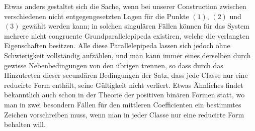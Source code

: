 \documentclass[11pt]{article}
\begin{document}
Etwas anders gestaltet sich die Sache, wenn bei unserer Construction zwischen verschiedenen nicht entgegengesetzten Lagen für die Punkte $(1)$, $(2)$ und $(3)$ gewählt werden kann; in solchen singulären Fällen können für das System mehrere nicht congruente Grundparallelepipeda existiren, welche die verlangten Eigenschaften besitzen. Alle diese Parallelepipeda lassen sich jedoch ohne Schwierigkeit vollständig aufzählen, und man kann immer eines derselben durch gewisse Nebenbedingungen von den übrigen trennen, so dass durch das Hinzutreten dieser secundären Bedingungen der Satz, dass jede Classe nur eine reducirte Form enthält, seine Gültigkeit nicht verliert. Etwas Ähnliches findet bekanntlich auch schon in der Theorie der positiven binären Formen statt, wo man in zwei besondern Fällen für den mittleren Coefficienten ein bestimmtes Zeichen vorschreiben muss, wenn man in jeder Classe nur eine reducirte Form behalten will.
\end{document}
